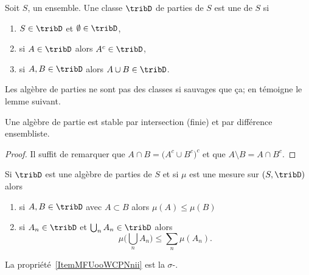\begin{definition}   \label{DefTCUoogGDud}
	Soit \( S\), un ensemble. Une classe \( \tribD\) de parties de \( S\) est une  de \( S\) si
	\begin{enumerate}
		\item
		      \( S\in\tribD\) et \( \emptyset\in\tribD\),
		\item
		      si \( A\in\tribD\) alors \( A^c\in\tribD\),
		\item
		      si \( A,B\in\tribD\) alors \( A\cup B\in\tribD\).
	\end{enumerate}
\end{definition}

Les algèbre de parties ne sont pas des classes si sauvages que ça; en témoigne le lemme suivant.
\begin{lemma}   \label{LemBFKootqXKl}
	Une algèbre de partie est stable par intersection (finie) et par différence ensembliste.
\end{lemma}

\begin{proof}
	Il suffit de remarquer que \( A\cap B=\big( A^c\cup B^c \big)^c\) et que \( A\setminus B=A\cap B^c\).
\end{proof}

\begin{lemma}  \label{LemZQUooMdCpq}
	Si \( \tribD\) est une algèbre de parties de \( S\) et si \( \mu\) est une mesure sur \( (S,\tribD)\) alors
	\begin{enumerate}
		\item
		      si \( A,B\in\tribD\) avec \( A\subset B\) alors \( \mu(A)\leq \mu(B)\)
		\item   \label{ItemMFUooWCPNnii}
		      si \( A_n\in\tribD\) et \( \bigcup_nA_n\in\tribD\) alors
		      \begin{equation}
			      \mu\big( \bigcup_nA_n \big)\leq\sum_n\mu(A_n).
		      \end{equation}
	\end{enumerate}
\end{lemma}
La propriété~\ref{ItemMFUooWCPNnii} est la \( \sigma\)-.


